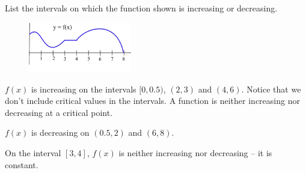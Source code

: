 \begin{example}
List the intervals on which the function shown is increasing or decreasing.

\begin{figure}[!ht]
  \centering
    \includegraphics[width=0.4\textwidth]{img/chap3/image072.png}
\end{figure}
\begin{solution} $f(x)$ is increasing on the intervals $[0,0.5)$, $(2,3)$ and $(4,6)$. Notice that we don't include critical values in the intervals. A function is neither increasing nor decreasing at a critical point.

$f(x)$ is decreasing on $(0.5,2)$ and $(6,8)$.

On the interval $[3,4]$, $f(x)$ is neither increasing nor decreasing -- it is constant.
\end{solution}\end{example}

